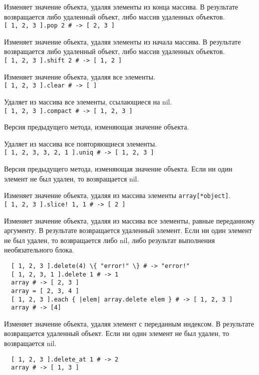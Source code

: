 \begin{methodlist}
  Изменяет значение объекта, удаляя элементы из конца массива. В результате возвращается либо удаленный объект, либо массив удаленных объектов. 
  \\\verb![ 1, 2, 3 ].pop 2 # -> [ 2, 3 ]!

  Изменяет значение объекта, удаляя элементы из начала массива. В результате возвращается либо удаленный объект, либо массив удаленных объектов. 
  \\\verb![ 1, 2, 3 ].shift 2 # -> [ 1, 2 ]!

  Изменяет значение объекта, удаляя все элементы.
  \\\verb![ 1, 2, 3 ].clear # -> [ ]!

  Удаляет из массива все элементы, ссылающиеся на nil. 
  \\\verb![ 1, 2, 3 ].compact # -> [ 1, 2, 3 ]!

  Версия предыдущего метода, изменяющая значение объекта. 

  Удаляет из массива все повторяющиеся элементы. 
  \\\verb![ 1, 2, 3, 3, 2, 1 ].uniq # -> [ 1, 2, 3 ]!

  Версия предыдущего метода, изменяющая значение объекта. Если ни один элемент не был удален, то возвращается nil. 

  Изменяет значение объекта, удаляя из массива элементы \verb!array[*object]!.
  \\\verb|[ 1, 2, 3 ].slice! 1, 1 # -> [ 2 ]|

  Изменяет значение объекта, удаляя из массива все элементы, равные переданному аргументу. В результате возвращается удаленный элемент. 
  Если ни один элемент не был удален, то возвращается либо nil, либо результат выполнения необязательного блока.
  \begin{verbatim}
  [ 1, 2, 3 ].delete(4) \{ "error!" \} # -> "error!"
  [ 1, 2, 3, 1 ].delete 1 # -> 1
  array # -> [ 2, 3 ]
  array = [ 2, 3, 4 ]
  [ 1, 2, 3 ].each { |elem| array.delete elem } # -> [ 1, 2, 3 ]
  array # -> [4]
  \end{verbatim}

  Изменяет значение объекта, удаляя элемент с переданным индексом. В результате возвращается удаленный объект. Если ни один элемент не был удален, то возвращается nil. 
  \begin{verbatim}
  [ 1, 2, 3 ].delete_at 1 # -> 2 
  array # -> [ 1, 3 ]
  \end{verbatim}


\end{methodlist}
